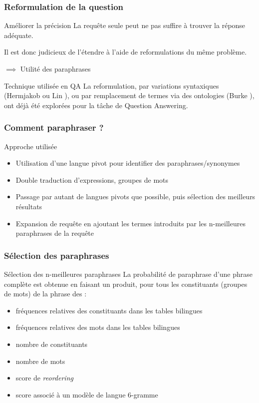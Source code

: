\documentclass[10pt]{beamer}
\begin{document}
\begin{frame}
  \frametitle{Reformulation de la question}
  \begin{block}{Améliorer la précision}
  La requête seule peut ne pas suffire à trouver la réponse adéquate.
  
  Il est donc judicieux de l'étendre à l'aide de reformulations du même problème.
  
  $\implies$ Utilité des paraphrases
  \end{block}
  \pause

  \begin{block}{Technique utilisée en QA}
    La reformulation, par variations syntaxiques (Hermjakob
    \cite{Hermjakob02} ou Lin \cite{Lin01}), ou par remplacement de
    termes via des ontologies (Burke \cite{Burke97}), ont déjà été
    explorées pour la tâche de Question Answering.
  \end{block}
\end{frame}

\begin{frame}
  \frametitle{Comment paraphraser ?}
  \begin{block}{Approche utilisée}
  \begin{itemize}
    \item Utilisation d'une langue pivot pour identifier des paraphrases/synonymes
    \item Double traduction d'expressions, groupes de mots
    \item Passage par autant de langues pivots que possible, puis sélection des meilleurs résultats
    \item Expansion de requête en ajoutant les termes introduits par les n-meilleures paraphrases de la requête
  \end{itemize}
  \end{block}
\end{frame}

\begin{frame}
  \frametitle{Sélection des paraphrases}
  \begin{block}{Sélection des n-meilleures paraphrases}
  La probabilité de paraphrase d'une phrase complète est obtenue en faisant un produit, pour tous les constituants (groupes de mots) de la phrase des :
  \begin{itemize}
    \item fréquences relatives des constituants dans les tables bilingues
    \item fréquences relatives des mots dans les tables bilingues
    \item nombre de constituants
    \item nombre de mots
    \item score de \textit{reordering}
    \item score associé à un modèle de langue 6-gramme
  \end{itemize}
  \end{block}
\end{frame}
\end{document}
